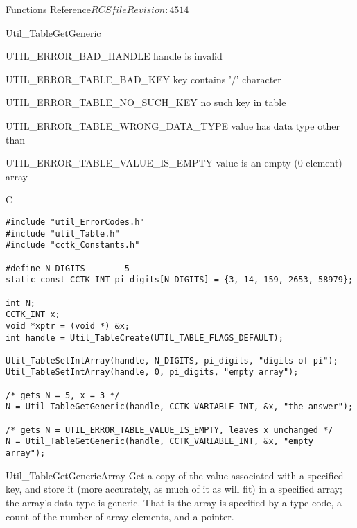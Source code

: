 \begin{cactuspart}{ Functions Reference}{$RCSfile$}{$Revision: 4514 $}
\begin{FunctionDescription}{Util\_TableGetGeneric}
\begin{ErrorSection}
\begin{Error}{UTIL\_ERROR\_BAD\_HANDLE}
handle is invalid
\end{Error}
\begin{Error}{UTIL\_ERROR\_TABLE\_BAD\_KEY}
key contains '/' character
\end{Error}
\begin{Error}{UTIL\_ERROR\_TABLE\_NO\_SUCH\_KEY}
no such key in table
\end{Error}
\begin{Error}{UTIL\_ERROR\_TABLE\_WRONG\_DATA\_TYPE}
value has data type other than 
\end{Error}
\begin{Error}{UTIL\_ERROR\_TABLE\_VALUE\_IS\_EMPTY}
value is an empty (0-element) array
\end{Error}
\end{ErrorSection}

\begin{ExampleSection}
\begin{Example}{C}
\begin{verbatim}
#include "util_ErrorCodes.h"
#include "util_Table.h"
#include "cctk_Constants.h"

#define N_DIGITS        5
static const CCTK_INT pi_digits[N_DIGITS] = {3, 14, 159, 2653, 58979};

int N;
CCTK_INT x;
void *xptr = (void *) &x;
int handle = Util_TableCreate(UTIL_TABLE_FLAGS_DEFAULT);

Util_TableSetIntArray(handle, N_DIGITS, pi_digits, "digits of pi");
Util_TableSetIntArray(handle, 0, pi_digits, "empty array");

/* gets N = 5, x = 3 */
N = Util_TableGetGeneric(handle, CCTK_VARIABLE_INT, &x, "the answer");

/* gets N = UTIL_ERROR_TABLE_VALUE_IS_EMPTY, leaves x unchanged */
N = Util_TableGetGeneric(handle, CCTK_VARIABLE_INT, &x, "empty array");
\end{verbatim}
\end{Example}
\end{ExampleSection}
\end{FunctionDescription}


\begin{FunctionDescription}{Util\_TableGetGenericArray}
\label{Util-TableGetGenericArray}
Get a copy of the value associated with a specified key, and store
it (more accurately, as much of it as will fit) in a specified array;
the array's data type is generic.  That is the array is specified by
a  type code, a count of the number of array
elements, and a  pointer.


\end{FunctionDescription}
\end{cactuspart}
